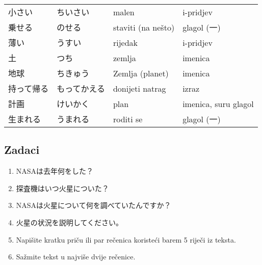 \documentclass[a5paper,10pt]{tekst}
\begin{document}
\begin{xltabular}{\linewidth}{>{\Large}l>{\Large}ll>{\raggedright\arraybackslash}X}
		小さい & ちいさい & malen & i-pridjev \\
		乗せる & のせる & staviti (na nešto) & glagol (一) \\
		薄い & うすい & rijedak & i-pridjev \\
		土 & つち & zemlja & imenica \\
		地球 & ちきゅう & Zemlja (planet) & imenica \\
		持って帰る & もってかえる & donijeti natrag & izraz \\
		計画 & けいかく & plan & imenica, suru glagol \\
		生まれる & うまれる & roditi se & glagol (一) \\ 
		\bottomrule
	\end{xltabular}

	\clearpage
	
	\subsection*{Zadaci}
	\begin{enumerate}
		\item NASAは去年何をした？
		\item 探査機はいつ火星についた？
		\item NASAは火星について何を調べていたんですか？
		\item 火星の状況を説明してください。
		\item Napišite kratku priču ili par rečenica koristeći barem 5 riječi iz teksta. 
		\item Sažmite tekst u najviše dvije rečenice.
	\end{enumerate}
\end{document}
